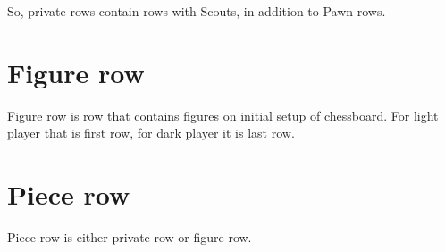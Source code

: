 So, private rows contain rows with Scouts, in addition to Pawn rows.

\section*{Figure row}
\label{sec:Terms/Figure row}
Figure row is row that contains figures on initial setup of chessboard.
For light player that is first row, for dark player it is last row.

\section*{Piece row}
\label{sec:Terms/Piece row}
Piece row is either private row or figure row.

\clearpage %
